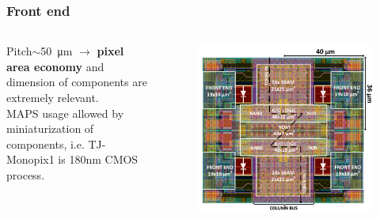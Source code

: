     \begin{frame}
        \frametitle{Front end}
            \begin{columns}
                Pitch$\sim$\SI{50}{\um} $\rightarrow$ \textbf{pixel area economy} and dimension of components are extremely relevant. \\\smallskip
                MAPS usage allowed by miniaturization of components, i.e. TJ-Monopix1 is 180{nm} CMOS process.\\
                    \begin{figure}[h!]
                        \vspace*{-1.05cm}\hspace*{-0.9cm}
                        \includegraphics[width=1.18\linewidth]{figures/Monopix1/Monopix1_2x2pixelsgroup.png}
                    \end{figure}
            \end{columns}


\end{frame}
